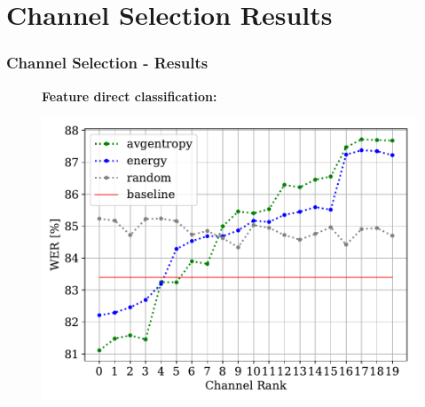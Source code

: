 \documentclass{beamer}
\begin{document}
\section{Channel Selection Results}
\begin{frame}
  \frametitle{Channel Selection - Results}
  \vspace{-.5em}
  
  \begin{figure}[!t]
  \begin{minipage}[tb]{.55\textwidth}
    \textbf{Feature direct classification:}
    \vspace{-.8em}
    {\scriptsize    
     
    }
  \end{minipage}%
  \hfill
  \begin{minipage}[tb]{.42\textwidth}
    \includegraphics[width=\textwidth]{img/wer_over_feat_ranks-S02.pdf}
  \end{minipage}
  \end{figure}
  
  \vspace{-.5em}  

  \pause
  

\end{frame}
\end{document}
